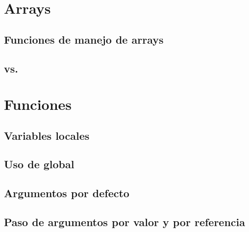 \documentclass[a4paper,11pt,spanish]{sphinxmanual}
\begin{document}
\section{Arrays}
\label{\detokenize{php:arrays}}

\subsection{Funciones de manejo de arrays}
\label{\detokenize{php:funciones-de-manejo-de-arrays}}

\subsection{}
\label{\detokenize{php:foreach}}

\subsection{ vs. }
\label{\detokenize{php:isset-vs-array-key-exists}}

\section{Funciones}
\label{\detokenize{php:funciones}}

\subsection{Variables locales}
\label{\detokenize{php:variables-locales}}

\subsection{Uso de global}
\label{\detokenize{php:uso-de-global}}

\subsection{Argumentos por defecto}
\label{\detokenize{php:argumentos-por-defecto}}

\subsection{Paso de argumentos por valor y por referencia}
\label{\detokenize{php:paso-de-argumentos-por-valor-y-por-referencia}}
\end{document}
